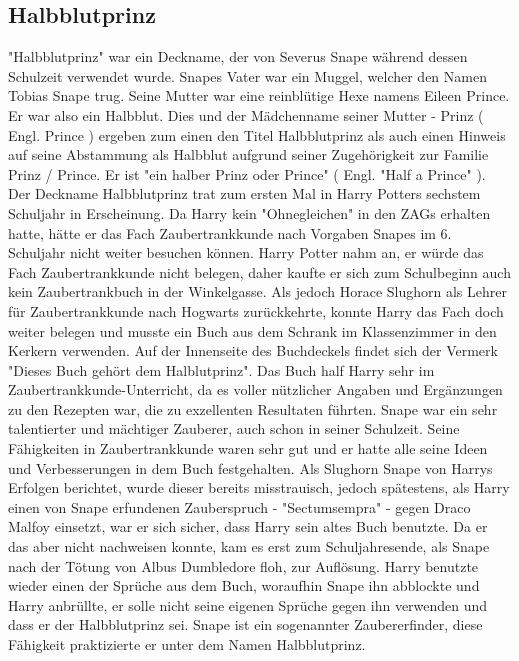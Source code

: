 \documentclass[a4paper, 10pt]{article}
\begin{document}
\subsection*{\Large Halbblutprinz}
"Halbblutprinz" war ein Deckname, der von Severus Snape während dessen Schulzeit verwendet wurde.
\vspace{10pt}
\newline
{}  
Snapes Vater war ein Muggel, welcher den Namen Tobias Snape trug. Seine Mutter war eine reinblütige Hexe namens Eileen Prince. Er war also ein Halbblut. Dies und der Mädchenname seiner Mutter - Prinz (  Engl.  Prince ) ergeben zum einen den Titel Halbblutprinz als auch einen Hinweis auf seine Abstammung als Halbblut aufgrund seiner Zugehörigkeit zur Familie Prinz / Prince. Er ist "ein halber Prinz oder Prince" (  Engl.  "Half a Prince" ).
\vspace{10pt}
\newline
{}  
Der Deckname Halbblutprinz trat zum ersten Mal in Harry Potters sechstem Schuljahr in Erscheinung. Da Harry kein "Ohnegleichen" in den ZAGs erhalten hatte, hätte er das Fach Zaubertrankkunde nach Vorgaben Snapes im 6. Schuljahr nicht weiter besuchen können. Harry Potter nahm an, er würde das Fach Zaubertrankkunde nicht belegen, daher kaufte er sich zum Schulbeginn auch kein Zaubertrankbuch in der Winkelgasse. Als jedoch Horace Slughorn als Lehrer für Zaubertrankkunde nach Hogwarts zurückkehrte, konnte Harry das Fach doch weiter belegen und musste ein Buch aus dem Schrank im Klassenzimmer in den Kerkern verwenden. Auf der Innenseite des Buchdeckels findet sich der Vermerk "Dieses Buch gehört dem Halblutprinz". Das Buch half Harry sehr im Zaubertrankkunde-Unterricht, da es voller nützlicher Angaben und Ergänzungen zu den Rezepten war, die zu exzellenten Resultaten führten. Snape war ein sehr talentierter und mächtiger Zauberer, auch schon in seiner Schulzeit. Seine Fähigkeiten in Zaubertrankkunde waren sehr gut und er hatte alle seine Ideen und Verbesserungen in dem Buch festgehalten.
\vspace{10pt}
\newline
{}  
Als Slughorn Snape von Harrys Erfolgen berichtet, wurde dieser bereits misstrauisch, jedoch spätestens, als Harry einen von Snape erfundenen Zauberspruch - "Sectumsempra" - gegen Draco Malfoy einsetzt, war er sich sicher, dass Harry sein altes Buch benutzte. Da er das aber nicht nachweisen konnte, kam es erst zum Schuljahresende, als Snape nach der Tötung von Albus Dumbledore floh, zur Auflösung. Harry benutzte wieder einen der Sprüche aus dem Buch, woraufhin Snape ihn abblockte und Harry anbrüllte, er solle nicht seine eigenen Sprüche gegen ihn verwenden und dass er der Halbblutprinz sei.
\vspace{10pt}
\newline
{}  
Snape ist ein sogenannter Zaubererfinder, diese Fähigkeit praktizierte er unter dem Namen Halbblutprinz.
\end{document}
